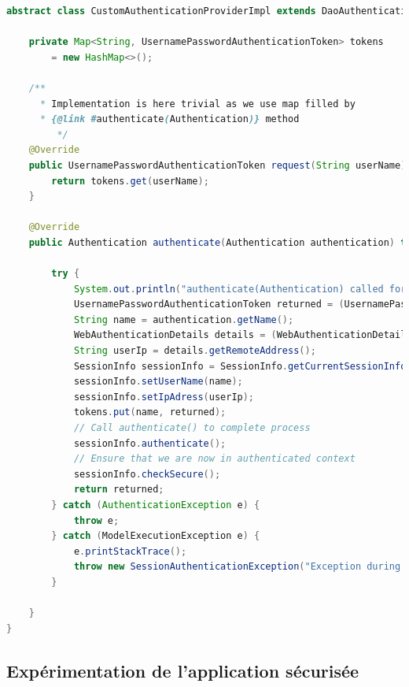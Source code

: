 \begin{lstlisting}[language=Java,basicstyle=\ttfamily\footnotesize, caption=Gestion de l'authentification : détail de \texttt{CustomAuthenticationProvider.java},label=listing:CustomAuthenticationProviderImpl]
abstract class CustomAuthenticationProviderImpl extends DaoAuthenticationProvider implements CustomAuthenticationProvider {

    private Map<String, UsernamePasswordAuthenticationToken> tokens 
        = new HashMap<>();
        
	/**
      * Implementation is here trivial as we use map filled by
      * {@link #authenticate(Authentication)} method
		 */
	@Override
	public UsernamePasswordAuthenticationToken request(String userName) {
		return tokens.get(userName);
	}

	@Override
	public Authentication authenticate(Authentication authentication) throws AuthenticationException {

		try {
			System.out.println("authenticate(Authentication) called for " + authentication);
			UsernamePasswordAuthenticationToken returned = (UsernamePasswordAuthenticationToken) super.authenticate(authentication);
			String name = authentication.getName();
			WebAuthenticationDetails details = (WebAuthenticationDetails) authentication.getDetails();
			String userIp = details.getRemoteAddress();
			SessionInfo sessionInfo = SessionInfo.getCurrentSessionInfo();
			sessionInfo.setUserName(name);
			sessionInfo.setIpAdress(userIp);
			tokens.put(name, returned);
			// Call authenticate() to complete process
			sessionInfo.authenticate();
			// Ensure that we are now in authenticated context
			sessionInfo.checkSecure();
			return returned;
		} catch (AuthenticationException e) {
			throw e;
		} catch (ModelExecutionException e) {
			e.printStackTrace();
			throw new SessionAuthenticationException("Exception during authentication: " + e.getMessage());
        }

	}
}
\end{lstlisting}

\subsection{Expérimentation de l'application sécurisée}

